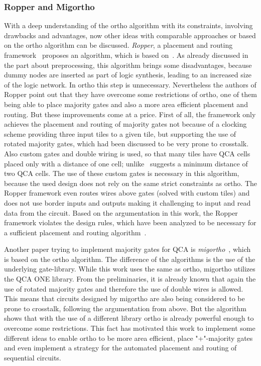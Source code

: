 \subsubsection{Ropper and Migortho}
With a deep understanding of the ortho algorithm with its constraints, involving drawbacks and advantages, now other ideas with comparable approaches or based on the ortho algorithm can be discussed. \emph{Ropper}, a placement and routing framework~\cite{ropper} proposes an algorithm, which is based on~\cite{trindade2016placement}. As already discussed in the part about preprocessing, this algorithm brings some disadvantages, because dummy nodes are inserted as part of logic synthesis, leading to an increased size of the logic network. In ortho this step is unnecessary. Nevertheless the authors of Ropper point out that they have overcome some restrictions of ortho, one of them being able to place majority gates and also a more area efficient placement and routing. But these improvements come at a price. First of all, the framework only achieves the placement and routing of majority gates not because of a clocking scheme providing three input tiles to a given tile, but supporting the use of rotated majority gates, which had been discussed to be very prone to crosstalk. Also custom gates and double wiring is used, so that many tiles have QCA cells placed only with a distance of one cell; unlike~\cite{crosstalk} suggests a minimum distance of two QCA cells. The use of these custom gates is necessary in this algorithm, because the used design does not rely on the same strict constraints as ortho. The Ropper framework even routes wires above gates (solved with custom tiles) and does not use border inputs and outputs making it challenging to input and read data from the circuit. Based on the argumentation in this work, the Ropper framework violates the design rules, which have been analyzed to be necessary for a sufficient placement and routing algorithm~\cite{ropper}.

Another paper trying to implement majority gates for QCA is \emph{migortho}~\cite{migortho}, which is based on the ortho algorithm. The difference of the algorithms is the use of the underlying gate-library. While this work uses the same as ortho, migortho utilizes the QCA ONE library. From the preliminaries, it is already known that again the use of rotated majority gates and therefore the use of double wires is allowed. This means that circuits designed by migortho are also being considered to be prone to crosstalk, following the argumentation from above. But the algorithm shows that with the use of a different library ortho is already powerful enough to overcome some restrictions. This fact has motivated this work to implement some different ideas to enable ortho to be more area efficient, place "+"-majority gates and even implement a strategy for the automated placement and routing of sequential circuits.

